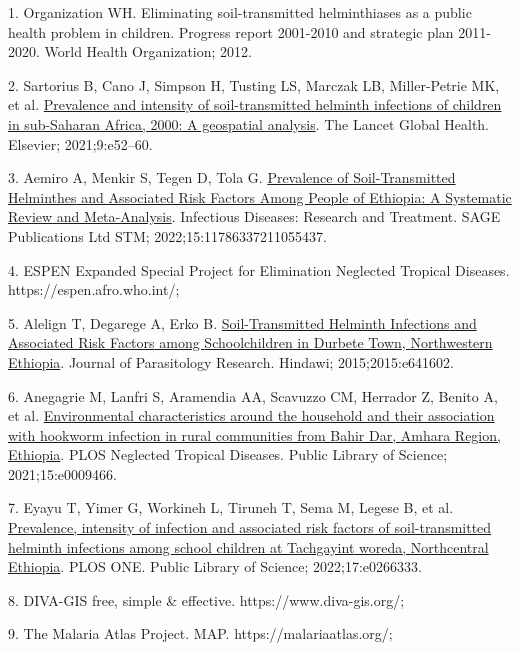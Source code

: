 \documentclass[
]{article}
\newlength{\cslhangindent}
\newlength{\cslentryspacingunit} %
\newenvironment{CSLReferences}[2] %
 {%
  \setlength{\parindent}{0pt}
  \ifodd #1
  \let\oldpar\par
  \def\par{\hangindent=\cslhangindent\oldpar}
  \fi
  \setlength{\parskip}{#2\cslentryspacingunit}
 }%
 {}
\begin{document}
\hypertarget{refs}{}
\begin{CSLReferences}{0}{0}
\leavevmode{}%
1. Organization WH. Eliminating soil-transmitted helminthiases as a
public health problem in children. {Progress} report 2001-2010 and
strategic plan 2011-2020. {World Health Organization}; 2012.

\leavevmode{}%
2. Sartorius B, Cano J, Simpson H, Tusting LS, Marczak LB, Miller-Petrie
MK, et al.
\href{https://doi.org/10.1016/S2214-109X(20)30398-3}{Prevalence and
intensity of soil-transmitted helminth infections of children in
sub-{Saharan Africa}, 2000: A geospatial analysis}. The
Lancet Global Health. {Elsevier}; 2021;9:e52--60.

\leavevmode{}%
3. Aemiro A, Menkir S, Tegen D, Tola G.
\href{https://doi.org/10.1177/11786337211055437}{Prevalence of
{Soil-Transmitted Helminthes} and {Associated Risk Factors Among People}
of {Ethiopia}: {A Systematic Review} and {Meta-Analysis}}. Infectious
Diseases: Research and Treatment. {SAGE Publications Ltd STM};
2022;15:11786337211055437.

\leavevmode{}%
4. {ESPEN} \textbar{} {Expanded Special Project} for {Elimination
Neglected Tropical Diseases}. https://espen.afro.who.int/;

\leavevmode{}%
5. Alelign T, Degarege A, Erko B.
\href{https://doi.org/10.1155/2015/641602}{Soil-{Transmitted Helminth
Infections} and {Associated Risk Factors} among {Schoolchildren} in
{Durbete Town}, {Northwestern Ethiopia}}. Journal of Parasitology
Research. {Hindawi}; 2015;2015:e641602.

\leavevmode{}%
6. Anegagrie M, Lanfri S, Aramendia AA, Scavuzzo CM, Herrador Z, Benito
A, et al.
\href{https://doi.org/10.1371/journal.pntd.0009466}{Environmental
characteristics around the household and their association with hookworm
infection in rural communities from {Bahir Dar}, {Amhara Region},
{Ethiopia}}. PLOS Neglected Tropical Diseases. {Public Library of
Science}; 2021;15:e0009466.

\leavevmode{}%
7. Eyayu T, Yimer G, Workineh L, Tiruneh T, Sema M, Legese B, et al.
\href{https://doi.org/10.1371/journal.pone.0266333}{Prevalence,
intensity of infection and associated risk factors of soil-transmitted
helminth infections among school children at {Tachgayint} woreda,
{Northcentral Ethiopia}}. PLOS ONE. {Public Library of Science};
2022;17:e0266333.

\leavevmode{}%
8. {DIVA-GIS} \textbar{} free, simple \& effective.
https://www.diva-gis.org/;

\leavevmode{}%
9. The {Malaria Atlas Project}. MAP. https://malariaatlas.org/;

\end{CSLReferences}
\end{document}
